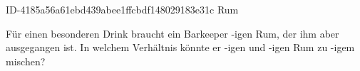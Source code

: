 \begin{exercise}
      {ID-4185a56a61ebd439abee1ffcbdf148029183e31c}
      {Rum}
  \ifproblem\problem\par
    Für einen besonderen Drink braucht ein Barkeeper -igen Rum, der ihm
    aber ausgegangen ist. In welchem Verhältnis könnte er -igen und
    -igen Rum zu -igem mischen?
  \fi
\end{exercise}
